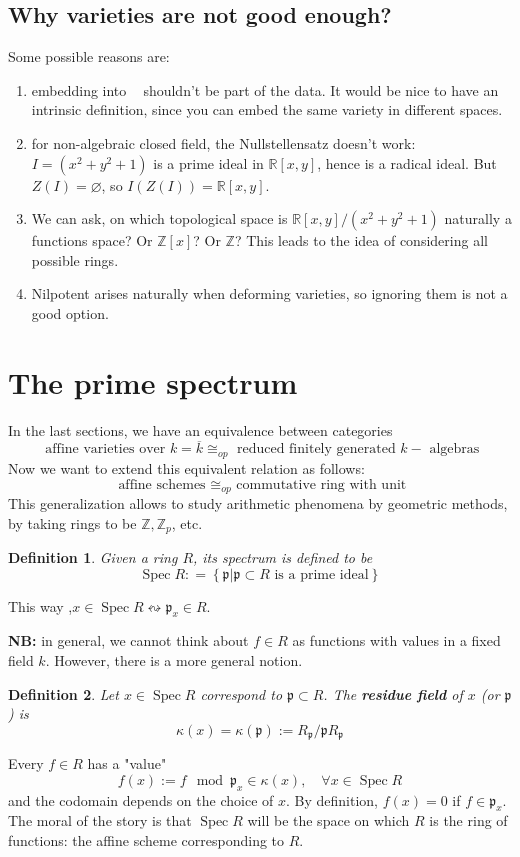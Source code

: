 \documentclass[12pt]{article} %
\newtheorem{definition}{Definition}
\DeclareMathOperator{\Aff}{\mathbb{A}^n}
\DeclareMathOperator{\Sp}{Spec}
\begin{document}
\subsection{Why varieties are not good enough?}
Some possible reasons are:
\begin{enumerate}
      \item embedding into $\Aff$ shouldn't be part of the data. It would be nice
            to have an intrinsic definition, since you can embed the same variety in different spaces.
      \item for non-algebraic closed field, the Nullstellensatz doesn't work: $I = (x^2+y^2+1)$ is a prime ideal in $\mathbb{R}[x,y]$, hence is a radical ideal.
            But $Z(I)= \varnothing$, so $I(Z(I)) = \mathbb{R}[x,y].$
      \item We can ask, on which topological space is $\mathbb{R}[x,y]/(x^2+y^2+1)$ naturally a functions space? Or $\mathbb{Z}[x]$? Or $\mathbb{Z}$?
            This leads to the idea of considering all possible rings.
      \item Nilpotent arises naturally when deforming varieties, so ignoring them is not a good option.
\end{enumerate}
\newpage
\section{The prime spectrum}
In the last sections, we have an equivalence between categories
\[\text{ affine varieties over $k=\overline{k}$} \cong_{op} \text{ reduced finitely generated $k-$ algebras}\]
Now we want to extend this equivalent relation as follows:
\[\text{ affine schemes } \cong_{op} \text{ commutative ring with unit}\]
This generalization allows to study arithmetic phenomena by geometric methods, by taking rings to be $\mathbb{Z},\mathbb{Z}_p$, etc.

\begin{definition}
      Given a ring $R$, its spectrum is defined to be
      \[\Sp R: = \left\lbrace \mathfrak{p} | \mathfrak{p} \subset R \text{ is a prime ideal}\right\rbrace\]
\end{definition}
This way ,$x \in \Sp R \leftrightsquigarrow \mathfrak{p}_x \in R$.

\textbf{NB:} in general, we cannot think about $f \in R$ as functions with values in a fixed field $k$. However, there is a more general notion.
\begin{definition}
      Let $x \in \Sp R$ correspond to $\mathfrak{p} \subset R$. The \textbf{residue field} of $x$
      (or $\mathfrak{p}$) is
      \[\kappa(x) = \kappa(\mathfrak{p}):= R_\mathfrak{p}/\mathfrak{p}R_\mathfrak{p}\]
\end{definition}
Every $f \in R$ has a "value"
\[f(x):=f \mod \mathfrak{p}_x \in \kappa(x), \quad \forall x \in \Sp R\]
and the codomain depends on the choice of $x$. By definition, $f(x)=0$ if $f \in \mathfrak{p}_x$. The moral of
the story is that $\Sp R$ will be the space on which $R$ is the ring of functions: the affine scheme corresponding to $R$.
\end{document}
